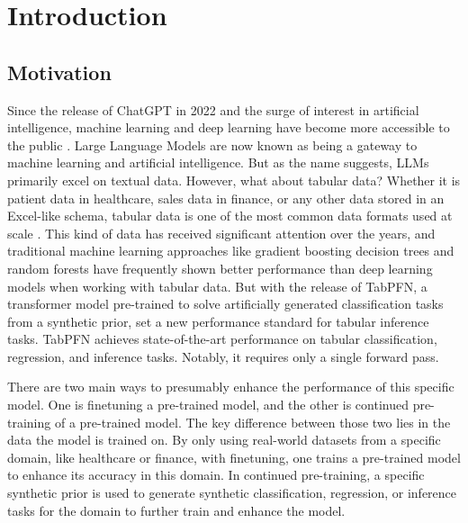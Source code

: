 \chapter{Introduction}
\label{chap:intro}
\section{Motivation}
\label{sec:motivation}
Since the release of ChatGPT in 2022 and the surge of interest in artificial intelligence, machine learning and deep learning have become more accessible to the public \citep{singla2025stateai}.
Large Language Models are now known as being a gateway to machine learning and artificial intelligence.
But as the name suggests, LLMs primarily excel on textual data.
However, what about tabular data?
Whether it is patient data in healthcare, sales data in finance, or any other data stored in an Excel-like schema, tabular data is one of the most common data formats used at scale \citep{van2024tabular}.
This kind of data has received significant attention over the years, and traditional machine learning approaches like gradient boosting decision trees and random forests have frequently shown better performance than deep learning models when working with tabular data.
\newline
But with the release of TabPFN, a transformer model pre-trained to solve artificially generated classification tasks from a synthetic prior, \citet{hollmann2022tabpfn} set a new performance standard for tabular inference tasks.
TabPFN achieves state-of-the-art performance on tabular classification, regression, and inference tasks.
Notably, it requires only a single forward pass.

There are two main ways to presumably enhance the performance of this specific model.
One is finetuning a pre-trained model, and the other is continued pre-training of a pre-trained model.
The key difference between those two lies in the data the model is trained on.
By only using real-world datasets from a specific domain, like healthcare or finance, with finetuning, one trains a pre-trained model to enhance its accuracy in this domain.
In continued pre-training, a specific synthetic prior is used to generate synthetic classification, regression, or inference tasks for the domain to further train and enhance the model.

